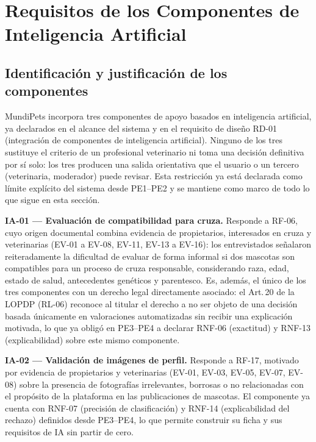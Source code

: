 \documentclass[journal,onecolumn]{IEEEtran}
\begin{document}
	

	\section{Requisitos de los Componentes de Inteligencia Artificial}
\label{sec:requisitos_ia}

\subsection{Identificación y justificación de los componentes}

MundiPets incorpora tres componentes de apoyo basados en inteligencia artificial, ya
declarados en el alcance del sistema y en el requisito de diseño RD-01 (integración de
componentes de inteligencia artificial). Ninguno de los tres sustituye el criterio de un
profesional veterinario ni toma una decisión definitiva por sí solo: los tres producen una
salida orientativa que el usuario o un tercero (veterinaria, moderador) puede revisar. Esta
restricción ya está declarada como límite explícito del sistema desde PE1--PE2 y se mantiene
como marco de todo lo que sigue en esta sección.

\textbf{IA-01 --- Evaluación de compatibilidad para cruza.} Responde a RF-06, cuyo origen
documental combina evidencia de propietarios, interesados en cruza y veterinarias (EV-01 a
EV-08, EV-11, EV-13 a EV-16): los entrevistados señalaron reiteradamente la dificultad de
evaluar de forma informal si dos mascotas son compatibles para un proceso de cruza responsable,
considerando raza, edad, estado de salud, antecedentes genéticos y parentesco. Es, además, el
único de los tres componentes con un derecho legal directamente asociado: el Art.\,20 de la
LOPDP (RL-06) reconoce al titular el derecho a no ser objeto de una decisión basada únicamente
en valoraciones automatizadas sin recibir una explicación motivada, lo que ya obligó en PE3--PE4
a declarar RNF-06 (exactitud) y RNF-13 (explicabilidad) sobre este mismo componente.

\textbf{IA-02 --- Validación de imágenes de perfil.} Responde a RF-17, motivado por evidencia de
propietarios y veterinarias (EV-01, EV-03, EV-05, EV-07, EV-08) sobre la presencia de
fotografías irrelevantes, borrosas o no relacionadas con el propósito de la plataforma en las
publicaciones de mascotas. El componente ya cuenta con RNF-07 (precisión de clasificación) y
RNF-14 (explicabilidad del rechazo) definidos desde PE3--PE4, lo que permite construir su ficha
y sus requisitos de IA sin partir de cero.
\end{document}
